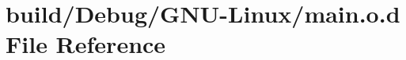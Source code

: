 \hypertarget{_g_n_u-_linux_2main_8o_8d}{}\section{build/\+Debug/\+G\+N\+U-\/\+Linux/main.o.\+d File Reference}
\label{_g_n_u-_linux_2main_8o_8d}
